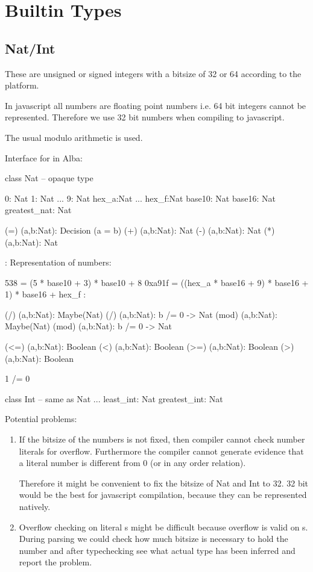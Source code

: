 \section{Builtin Types}


\subsection{Nat/Int}

These are unsigned or signed integers with a bitsize of 32 or 64 according to
the platform.

In javascript all numbers are floating point numbers i.e. 64 bit
integers cannot be represented. Therefore we use 32 bit numbers when compiling
to javascript.

The usual modulo arithmetic is used.

Interface for  in Alba:
%
\begin{alba}
  class Nat       -- opaque type

  0: Nat
  1: Nat
  ...
  9: Nat
  hex_a:Nat
  ...
  hex_f:Nat
  base10:   Nat
  base16:   Nat
  greatest_nat: Nat

  (=) (a,b:Nat): Decision (a = b)
  (+) (a,b:Nat): Nat
  (-) (a,b:Nat): Nat
  (*) (a,b:Nat): Nat

  {: Representation of numbers:

    538    =  (5 * base10 + 3) * base10 + 8
    0xa91f =  ((hex_a * base16 + 9) * base16 + 1) * base16 + hex_f
  :}

  (/) (a,b:Nat): Maybe(Nat)
  (/) (a,b:Nat): b /= 0 -> Nat
  (mod) (a,b:Nat): Maybe(Nat)
  (mod) (a,b:Nat): b /= 0 -> Nat

  (<=) (a,b:Nat): Boolean
  (<)  (a,b:Nat): Boolean
  (>=) (a,b:Nat): Boolean
  (>)  (a,b:Nat): Boolean

  1 /= 0
\end{alba}

\begin{alba}
  class Int
  -- same as Nat
  ...
  least_int:    Nat
  greatest_int: Nat
\end{alba}


Potential problems:
\begin{enumerate}
\item If the bitsize of the numbers is not fixed, then compiler cannot check
  number literals for overflow. Furthermore the compiler cannot generate
  evidence that a literal number is different from 0 (or in any order
  relation).

  Therefore it might be convenient to fix the bitsize of Nat and Int to 32. 32
  bit would be the best for javascript compilation, because they can be
  represented natively.


\item Overflow checking on literal s might be difficult because
  overflow is valid on s. During parsing we could check how much
  bitsize is necessary to hold the number and after typechecking see what
  actual type has been inferred and report the problem.
\end{enumerate}



